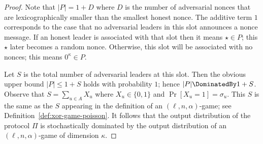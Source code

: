 \begin{proof}
		Note that 
		$|P| = 1 + D$ where $D$ is the number of adversarial nonces that are 
		lexicographically smaller than the smallest honest nonce. 
		The additive term $1$ corresponds to the case that 
		no adversarial leaders in this slot announces a nonce message. 
		If an honest leader is associated with that slot 
		then it means $\star \in P$; this $\star$ later becomes a random nonce. 
		Otherwise, this slot will be associated with no nonces; 
		this means $0^\kappa \in P$.

		Let $S$ is the total number of adversarial leaders at this slot.
		Then the obvious upper bound $|P| \leq 1 + S$ holds with probability $1$; 
		hence $|P| \DominatedBy 1 + S$. 
		Observe that $S = \sum_{u \in A} X_u$ where $X_u \in \{0,1\}$ and $\Pr[X_u = 1] = \sigma_u$. 
		This $S$ is the same as the $S$ appearing in the definition  
		of an $(\ell, n, \alpha)$-game; see Definition~\ref{def:xor-game-poisson}.
		It follows that the 
		output distribution of the protocol $\Pi$
		is 
		stochastically dominated by the 
		output distribution of 
		an $(\ell, n, \alpha)$-game of dimension $\kappa$.
\end{proof}












